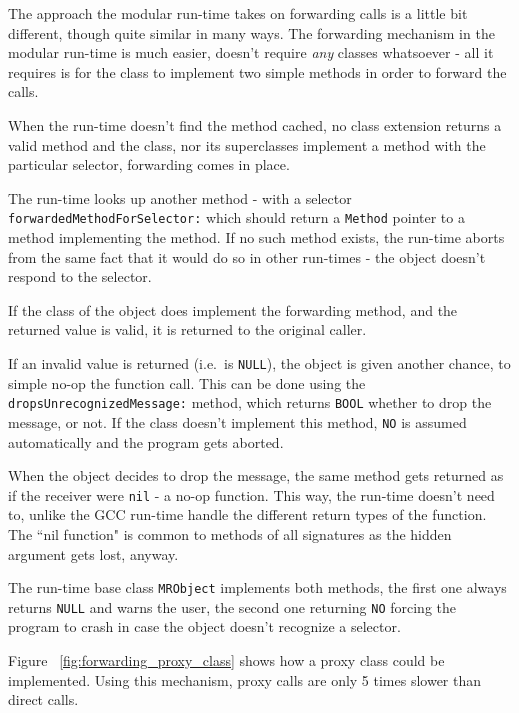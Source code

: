 The approach the modular run-time takes on forwarding calls is a little bit different, though quite similar in many ways. The forwarding mechanism in the modular run-time is much easier, doesn't require \emph{any} classes whatsoever - all it requires is for the class to implement two simple methods in order to forward the calls.

When the run-time doesn't find the method cached, no class extension returns a valid method and the class, nor its superclasses implement a method with the particular selector, forwarding comes in place.

The run-time looks up another method - with a selector \verb=forwardedMethodForSelector:= which should return a \verb=Method= pointer to a method implementing the method. If no such method exists, the run-time aborts from the same fact that it would do so in other run-times - the object doesn't respond to the selector.

If the class of the object does implement the forwarding method, and the returned value is valid, it is returned to the original caller.

If an invalid value is returned (i.e.\ is \verb=NULL=), the object is given another chance, to simple no-op the function call. This can be done using the \verb=dropsUnrecognizedMessage:= method, which returns \verb=BOOL= whether to drop the message, or not. If the class doesn't implement this method, \verb=NO= is assumed automatically and the program gets aborted.

When the object decides to drop the message, the same method gets returned as if the receiver were \verb=nil= - a no-op function. This way, the run-time doesn't need to, unlike the GCC run-time handle the different return types of the function. The ``nil function" is common to methods of all signatures as the hidden argument gets lost, anyway.

The run-time base class \verb=MRObject= implements both methods, the first one always returns \verb=NULL= and warns the user, the second one returning \verb=NO= forcing the program to crash in case the object doesn't recognize a selector.

Figure ~\ref{fig:forwarding_proxy_class} shows how a proxy class could be implemented. Using this mechanism, proxy calls are only 5 times slower than direct calls.

